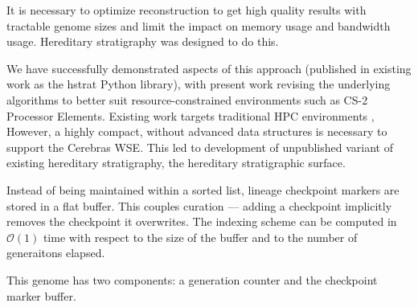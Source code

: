 It is necessary to optimize reconstruction to get high quality results with tractable genome sizes and limit the impact on memory usage and bandwidth usage.
Hereditary stratigraphy \citep{moreno2022hereditary} was designed to do this.

We have successfully demonstrated aspects of this approach (published in existing work as the hstrat Python library), with present work revising the underlying algorithms to better suit resource-constrained environments such as CS-2 Processor Elements.
Existing work targets traditional HPC environments \citep{moreno2022hstrat},
However, a highly compact, without advanced data structures is necessary to support the Cerebras WSE.
This led to development of unpublished variant of existing hereditary stratigraphy, the hereditary stratigraphic surface.



Instead of being maintained within a sorted list, lineage checkpoint markers are stored in a flat buffer.
This couples curation --- adding a checkpoint implicitly removes the checkpoint it overwrites.
The indexing scheme can be computed in $\mathcal{O(1)}$ time with respect to the size of the buffer and to the number of generaitons elapsed.

This genome has two components: a generation counter and the checkpoint marker buffer.

